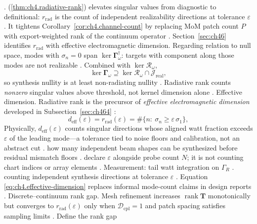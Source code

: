 \cite{harrington2001}.
(\ref{thm:ch4.radiative-rank}) elevates singular values from diagnostic to definitional: \(r_{\mathrm{rad}}\) is
the count of independent realizability directions at tolerance \(\varepsilon\) \cite{hansen1988}. It tightens
Corollary~\ref{cor:ch4.channel-count} by replacing MoM patch count \(P\) with export-weighted rank of the continuum
operator \cite{harrington2001}. Section~\ref{sec:ch46} identifies \(r_{\mathrm{rad}}\) with effective
electromagnetic dimension.
Regarding relation to null space, modes with \(\sigma_{n}=0\) span \(\ker\boldsymbol{\Gamma}_\omega^{\dagger}\): targets with component along those
modes are not realizable \cite{stratton1941}. Combined with \(\ker\mathcal{R}_\omega\),
\begin{equation}
\label{eq:ch4.rank-null-composition}
\ker\boldsymbol{\Gamma}_\omega
\supseteq
\ker\mathcal{R}_\omega\cap\mathcal{J}_{\mathrm{real}},
\end{equation}
so synthesis nullity is at least non-radiating nullity \cite{harrington2001}. Radiative rank counts
\emph{nonzero} singular values above threshold, not kernel dimension alone \cite{devaney2004}.
Effective dimension. Radiative rank is the precursor of \emph{effective electromagnetic dimension} developed in
Subsection~\ref{sec:ch464} \cite{harrington2001}:
\begin{equation}
\label{eq:ch4.effective-dimension}
d_{\mathrm{eff}}(\varepsilon)
=
r_{\mathrm{rad}}(\varepsilon)
=
\#\big\{n:\ \sigma_{n}\ge\varepsilon\,\sigma_{1}\big\},
\end{equation}
Physically, $d_{\mathrm{eff}}(\varepsilon)$ counts singular directions whose aligned watt fraction exceeds $\varepsilon$ of the leading mode---a tolerance tied to noise floors and calibration, not an abstract cut \cite{harrington2001}. how many independent beam shapes can be synthesized before residual mismatch floors \cite{hansen1988}. declare $\varepsilon$ alongside probe count $N$; it is not counting chart indices or array elements \cite{harrington2001}. Measurement: tail watt integration on $\Gamma_R$ \cite{poynting1884}.
counting independent synthesis directions at tolerance \(\varepsilon\) \cite{stratton1941}. Equation
\eqref{eq:ch4.effective-dimension} replaces informal mode-count claims in design reports \cite{devaney2004}.
Discrete--continuum rank gap. Mesh refinement increases \(\operatorname{rank}\mathbf{T}\) monotonically but converges to
\(r_{\mathrm{rad}}(\varepsilon)\) only when \(\mathcal{D}_{\mathrm{cpl}}=1\) and patch spacing satisfies sampling limits
\cite{harrington2001}. Define the rank gap
